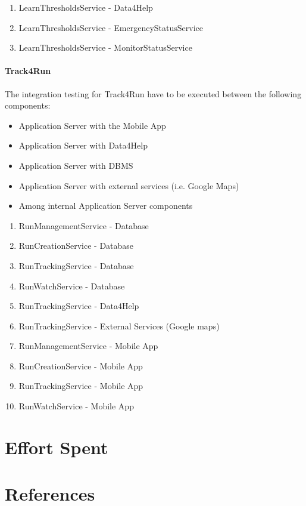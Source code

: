 \documentclass[a4paper]{article}
\begin{document}
\begin{enumerate}
    \item LearnThresholdsService - Data4Help
    \item LearnThresholdsService - EmergencyStatusService
    \item LearnThresholdsService - MonitorStatusService
\end{enumerate}

\paragraph{Track4Run}
The integration testing for Track4Run have to be executed between the following components:

\begin{itemize}
    \item Application Server with the Mobile App
    \item Application Server with Data4Help
    \item Application Server with DBMS
    \item Application Server with external services (i.e. Google Maps)
    \item Among internal Application Server components
\end{itemize}

\begin{enumerate}
    \item RunManagementService - Database
    \item RunCreationService - Database
    \item RunTrackingService - Database
    \item RunWatchService - Database
    \item RunTrackingService - Data4Help
    \item RunTrackingService - External Services (Google maps)
    \item RunManagementService - Mobile App
    \item RunCreationService - Mobile App
    \item RunTrackingService - Mobile App
    \item RunWatchService - Mobile App
\end{enumerate}



\section{Effort Spent}

\section{References}
\end{document}
